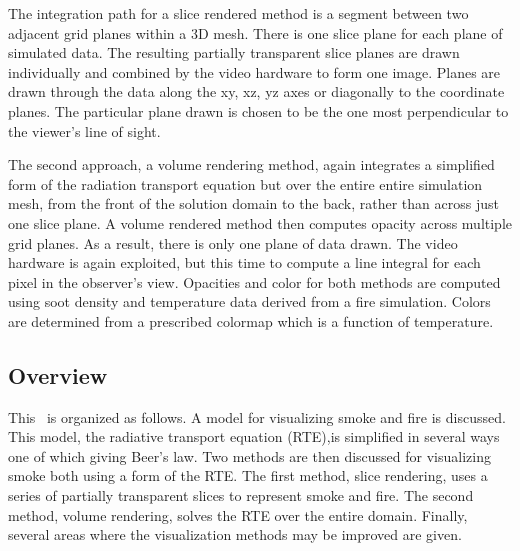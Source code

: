 The integration path for a slice rendered method is a segment between two adjacent grid planes within a 3D mesh. There is one slice plane for each plane of simulated data. The resulting partially transparent slice planes are drawn individually and combined by the video hardware to form one image. Planes are drawn through the data along the xy, xz, yz axes or diagonally to the coordinate planes.  The particular plane drawn is chosen to be the one most perpendicular to the viewer's line of sight.

The second approach, a volume rendering method, again integrates a simplified form of the radiation transport equation but over the entire entire simulation mesh, from the front of the solution domain to the back, rather than across just one slice plane. A volume rendered method then computes opacity across multiple grid planes.  As a result, there is only one plane of data drawn.  The video hardware is again exploited, but this time to compute a line integral for each pixel in the observer's view.  Opacities and color for both methods are computed using soot density and temperature data derived from a fire simulation. Colors are determined from a prescribed colormap which is a function of
temperature.

\subsection{Overview}
This \paper\ is organized as follows.  A model for visualizing smoke and fire is discussed.  This model, the radiative transport equation (RTE),is simplified in several ways one of which giving Beer's law.  Two methods are then discussed for visualizing smoke  both using a form of the RTE.  The first method, slice rendering,  uses a series of partially transparent slices to represent smoke and fire. The second method, volume rendering, solves the RTE over the entire domain. Finally, several areas where the visualization methods may be improved are given.





%
%

